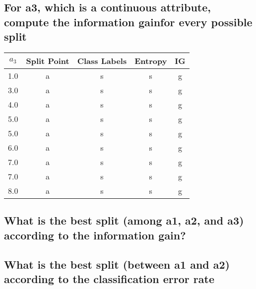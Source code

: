 \documentclass[11pt]{scrartcl} %
\begin{document}
\subsection{For a3, which is a continuous attribute, compute the information gainfor every possible split}
\begin{left}
\begin{tabular}{ | c | c | c | c | c | }
\hline
\textbf{$a_3$} & \textbf{Split Point} & \textbf{Class Labels} & \textbf{Entropy} & \textbf{IG} \\
\hline
1.0 & a & s & s & g\\
\hline
3.0 & a & s & s & g\\
\hline
4.0 & a & s & s & g\\
\hline
5.0 & a & s & s & g\\
5.0 & a & s & s & g\\
\hline
6.0 & a & s & s & g\\
\hline
7.0 & a & s & s & g\\
7.0 & a & s & s & g\\
\hline
8.0 & a & s & s & g\\
\hline


\end{tabular}
\end{left}
\subsection{What is the best split (among a1, a2, and a3) according to the information gain?}
\subsection{What is the best split (between a1 and a2) according to the classification error rate}

\end{document}
